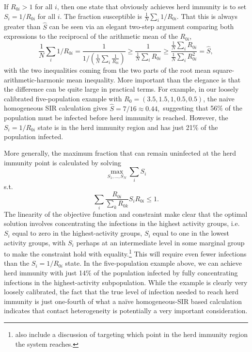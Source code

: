 \documentclass[11pt]{article}
\begin{document}
If $R_{0i} > 1$ for all $i$, then one state that obviously achieves herd immunity is to set $S_i = 1/R_{0i}$ for all $i$. The fraction 
susceptible is $\frac{1}{N} \sum_i 1/R_{0i}$. That this is always greater than $\hat{S}$ can be seen via an
elegant two-step argument comparing both expressions to the reciprocal of the arithmetic mean of the $R_{0i}$,
$$
\frac{1}{N} \sum_i 1/R_{0i} = \frac{1}{1/\left(\frac{1}{N} \sum_i \frac{1}{R_{0i}}\right)} 
\geq \frac{1}{\frac{1}{N} \sum_i R_{0i}} 
\geq \frac{\frac{1}{N} \sum_i R_{0i}}{\frac{1}{N} \sum_i R_{0i}^2} = \hat{S},
$$
with the two inequalities coming from the two parts of the root mean square-arithmetic-harmonic mean inequality.
More important than the elegance is that the difference can be quite large in practical terms.
For example, in our loosely calibrated five-population example with $R_0 = (3.5, 1.5, 1, 0.5, 0.5)$, the naive homogeneous
SIR calculation gives $\hat{S} = 7/16 \approx 0.44,$ suggesting that 56\% of the population must be infected before herd immunity is reached. 
However, the $S_i = 1/R_{0i}$ state is in the herd immunity region and has just 21\% of the population infected.

More generally, the maximum fraction that can remain uninfected
at the herd immunity point is calculated by solving
$$
\max_{S_1, \ldots, S_N} \sum_i S_i
$$
\hspace{10mm} s.t.
$$
\sum_i \frac{R_{0i}}{\sum_k R_{0k}} S_i R_{0i} \leq 1. 
$$
The linearity of the objective function and constraint make clear that the optimal solution involves concentrating the infections in
the highest activity groups, i.e. $S_i$ equal to zero in the highest-activity groups, $S_i$ equal to one in the lowest activity groups, 
with $S_i$ perhaps at an intermediate level in some marginal group to make the constraint hold with equality.\footnote{\citet{acemoglu2020multi} also include a discussion of targeting which point in the herd immunity region the system reaches.} 
This will require
even fewer infections than the $S_i = 1/R_{0i}$ state. In the five-population example above, we can achieve herd immunity with just
14\% of the population infected by fully concentrating infections in the highest-activity subpopulation. While the example is clearly very
loosely calibrated, the fact that the true level
of infection needed to reach herd immunity is just
one-fourth of what a na\"ive homogeneous-SIR based 
calculation indicates that contact heterogeneity
is potentially a very important consideration.
\end{document}
